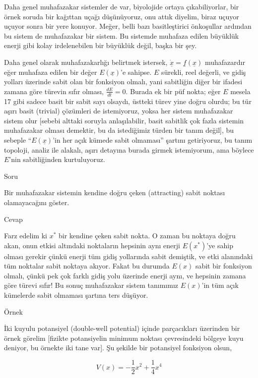 \documentclass[12pt,fleqn]{article}\usepackage{../../common}
\begin{document}
Daha genel muhafazakar sistemler de var, biyolojide ortaya çıkabiliyorlar, bir
örnek soruda bir kağıttan uçağı düşünüyoruz, onu attık diyelim, biraz uçuyor
uçuyor sonra bir yere konuyor. Meğer, belli bazı basitleştirici önkoşullar
ardından bu sistem de muhafazakar bir sistem. Bu sistemde muhafaza edilen
büyüklük enerji gibi kolay irdelenebilen bir büyüklük değil, başka bir şey. 

Daha genel olarak muhafazakarlığı belirtmek istersek, $\dot{\underline{x}} =
\underline{f} (\underline{x})$ muhafazardır eğer muhafaza edilen bir değer
$E(\underline{x})$'e sahipse. $E$ sürekli, reel değerli, ve gidiş yolları
üzerinde sabit olan bir fonksiyon olmalı, yani sabitliğin diğer bir ifadesi
zamana göre türevin sıfır olması, $\frac{dE}{dt}=0$. Burada ek bir püf nokta;
eğer $E$ mesela 17 gibi sadece basit bir sabit sayı olsaydı, üstteki türev yine
doğru olurdu; bu tür aşırı basit (trivial) çözümleri de istemiyoruz, yoksa her
sistem muhafazakar sistem olur [sebebi alttaki soruyla anlaşılabilir, basit
 sabitlik çok fazla sistemin muhafazakar olması demektir, bu da istediğimiz
 türden bir tanım değil], bu sebeple ``$E(\underline{x})$'in her açık kümede
sabit olmaması'' şartını getiriyoruz, bu tanım topoloji, analiz ile alakalı,
aşırı detayına burada girmek istemiyorum, ama böylece $E$'nin sabitliğinden
kurtuluyoruz.

Soru

Bir muhafazakar sistemin kendine doğru çeken (attracting) sabit noktası
olamayacağını göster.

Cevap

Farz edelim ki $x^\ast$ bir kendine çeken sabit nokta. O zaman bu noktaya doğru
akan, onun etkisi altındaki noktaların hepsinin aynı enerji $E(x^\ast)$'ye sahip
olması gerekir çünkü enerji tüm gidiş yollarında sabit demiştik, ve etki
alanındaki tüm noktalar sabit noktaya akıyor. Fakat bu durumda $E(x)$ sabit bir
fonksiyon olmalı, çünkü pek çok farklı gidiş yolu üzerinde enerji aynı, ve
hepsinin zamana göre türevi sıfır! Bu sonuç muhafazakar sistem tanımımız
$E(x)$'in tüm açık kümelerde sabit olmaması şartına ters düşüyor. 

Örnek

İki kuyulu potansiyel (double-well potential) içinde parçacıkları üzerinden bir
örnek görelim [fizikte potansiyelin minimum noktası çevresindeki bölgeye kuyu
deniyor, bu örnekte iki tane var]. Şu şekilde bir potansiyel fonksiyon olsun,

$$ V(x) = -\frac{1}{2}x^2 + \frac{1}{4}x^4 $$
\end{document}
